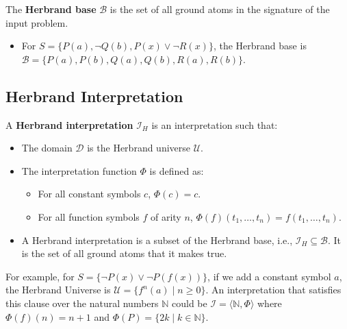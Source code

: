 \documentclass[11pt,a4paper]{article}
\theoremstyle{definition}
\theoremstyle{plain}
\theoremstyle{remark}
\begin{document}
The \textbf{Herbrand base} $\mathcal{B}$ is the set of all ground atoms in the signature of the input problem.

\begin{itemize}

    \item For $S = \{ P(a), \neg Q(b), P(x) \vee \neg R(x) \}$, the Herbrand base is $\mathcal{B} = \{ P(a), P(b), Q(a), Q(b), R(a), R(b) \}$.

\end{itemize}



\subsection{Herbrand Interpretation}

A \textbf{Herbrand interpretation} $\mathcal{I}_H$ is an interpretation such that:

\begin{itemize}

    \item The domain $\mathcal{D}$ is the Herbrand universe $\mathcal{U}$.

    \item The interpretation function $\Phi$ is defined as:

    \begin{itemize}

        \item For all constant symbols $c$, $\Phi(c) = c$.

        \item For all function symbols $f$ of arity $n$, $\Phi(f)(t_1, \dots, t_n) = f(t_1, \dots, t_n)$.

    \end{itemize}

    \item A Herbrand interpretation is a subset of the Herbrand base, i.e., $\mathcal{I}_H \subseteq \mathcal{B}$. It is the set of all ground atoms that it makes true.

\end{itemize}

For example, for $S = \{ \neg P(x) \vee \neg P(f(x)) \}$, if we add a constant symbol $a$, the Herbrand Universe is $\mathcal{U} = \{ f^n(a) \mid n \geq 0 \}$. An interpretation that satisfies this clause over the natural numbers $\mathbb{N}$ could be $\mathcal{I} = \langle \mathbb{N}, \Phi \rangle$ where $\Phi(f)(n) = n+1$ and $\Phi(P) = \{ 2k \mid k \in \mathbb{N} \}$.
\end{document}
